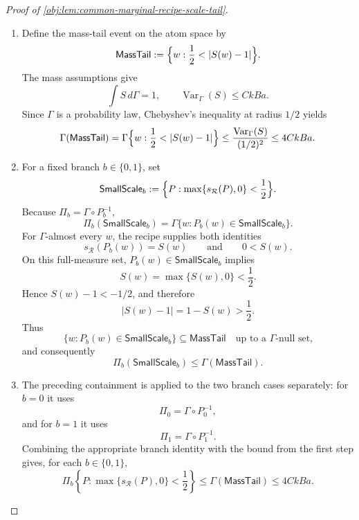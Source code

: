 \begin{proof}[Proof of \cref{obj:lem:common-marginal-recipe-scale-tail}]
\begin{enumerate}
\item Define the mass-tail event on the atom space by
\[
\mathsf{MassTail}
:=
\Bigl\{w:\frac12<|S(w)-1|\Bigr\}.
\]
The mass assumptions give
\[
\int S\,d\Gamma=1,
\qquad
\operatorname{Var}_{\Gamma}(S)\le CkBa.
\]
Since \(\Gamma\) is a probability law, Chebyshev's inequality at radius \(1/2\) yields
\[
\Gamma(\mathsf{MassTail})
=
\Gamma\Bigl\{w:\frac12<|S(w)-1|\Bigr\}
\le
\frac{\operatorname{Var}_{\Gamma}(S)}{(1/2)^2}
\le
4CkBa .
\]

\item For a fixed branch \(b\in\{0,1\}\), set
\[
\mathsf{SmallScale}_b
:=
\Bigl\{P:\max\{s_{\mathcal R}(P),0\}<\frac12\Bigr\}.
\]
Because \(\Pi_b=\Gamma\circ P_b^{-1}\),
\[
\Pi_b(\mathsf{SmallScale}_b)
=
\Gamma\{w:P_b(w)\in\mathsf{SmallScale}_b\}.
\]
For \(\Gamma\)-almost every \(w\), the recipe supplies both identities
\[
s_{\mathcal R}(P_b(w))=S(w)
\qquad\text{and}\qquad
0<S(w).
\]
On this full-measure set, \(P_b(w)\in\mathsf{SmallScale}_b\) implies
\[
S(w)=\max\{S(w),0\}<\frac12.
\]
Hence \(S(w)-1<-1/2\), and therefore
\[
|S(w)-1|=1-S(w)>\frac12.
\]
Thus
\[
\{w:P_b(w)\in\mathsf{SmallScale}_b\}
\subseteq \mathsf{MassTail}
\quad\text{up to a \(\Gamma\)-null set,}
\]
and consequently
\[
\Pi_b(\mathsf{SmallScale}_b)\le \Gamma(\mathsf{MassTail}).
\]

\item The preceding containment is applied to the two branch cases separately: for \(b=0\) it uses
\[
\Pi_0=\Gamma\circ P_0^{-1},
\]
and for \(b=1\) it uses
\[
\Pi_1=\Gamma\circ P_1^{-1}.
\]
Combining the appropriate branch identity with the bound from the first step gives, for each
\(b\in\{0,1\}\),
\[
\Pi_b\!\left\{P:\max\{s_{\mathcal R}(P),0\}<\frac12\right\}
\le
\Gamma(\mathsf{MassTail})
\le
4CkBa .
\]
\end{enumerate}
\end{proof}

